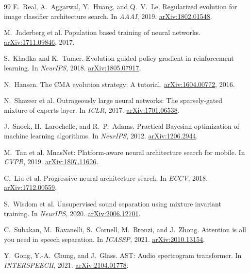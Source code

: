 \documentclass[10pt,twocolumn,letterpaper]{article}
\theoremstyle{remark}
\begin{document}
{\begin{thebibliography}{99}
E.~Real, A.~Aggarwal, Y.~Huang, and Q.~V.~Le.
\newblock Regularized evolution for image classifier architecture search.
\newblock In \emph{AAAI}, 2019.
\newblock \href{https://arxiv.org/abs/1802.01548}{arXiv:1802.01548}.

M.~Jaderberg et al.
\newblock Population based training of neural networks.
\newblock \href{https://arxiv.org/abs/1711.09846}{arXiv:1711.09846}, 2017.

S.~Khadka and K.~Tumer.
\newblock Evolution-guided policy gradient in reinforcement learning.
\newblock In \emph{NeurIPS}, 2018.
\newblock \href{https://arxiv.org/abs/1805.07917}{arXiv:1805.07917}.

N.~Hansen.
\newblock The CMA evolution strategy: A tutorial.
\newblock \href{https://arxiv.org/abs/1604.00772}{arXiv:1604.00772}, 2016.

N.~Shazeer et al.
\newblock Outrageously large neural networks: The sparsely-gated mixture-of-experts layer.
\newblock In \emph{ICLR}, 2017.
\newblock \href{https://arxiv.org/abs/1701.06538}{arXiv:1701.06538}.

J.~Snoek, H.~Larochelle, and R.~P.~Adams.
\newblock Practical Bayesian optimization of machine learning algorithms.
\newblock In \emph{NeurIPS}, 2012.
\newblock \href{https://arxiv.org/abs/1206.2944}{arXiv:1206.2944}.

M.~Tan et al.
\newblock MnasNet: Platform-aware neural architecture search for mobile.
\newblock In \emph{CVPR}, 2019.
\newblock \href{https://arxiv.org/abs/1807.11626}{arXiv:1807.11626}.

C.~Liu et al.
\newblock Progressive neural architecture search.
\newblock In \emph{ECCV}, 2018.
\newblock \href{https://arxiv.org/abs/1712.00559}{arXiv:1712.00559}.

S.~Wisdom et al.
\newblock Unsupervised sound separation using mixture invariant training.
\newblock In \emph{NeurIPS}, 2020.
\newblock \href{https://arxiv.org/abs/2006.12701}{arXiv:2006.12701}.

C.~Subakan, M.~Ravanelli, S.~Cornell, M.~Bronzi, and J.~Zhong.
\newblock Attention is all you need in speech separation.
\newblock In \emph{ICASSP}, 2021.
\newblock \href{https://arxiv.org/abs/2010.13154}{arXiv:2010.13154}.

Y.~Gong, Y.-A.~Chung, and J.~Glass.
\newblock AST: Audio spectrogram transformer.
\newblock In \emph{INTERSPEECH}, 2021.
\newblock \href{https://arxiv.org/abs/2104.01778}{arXiv:2104.01778}.


\end{thebibliography}}
\end{document}
